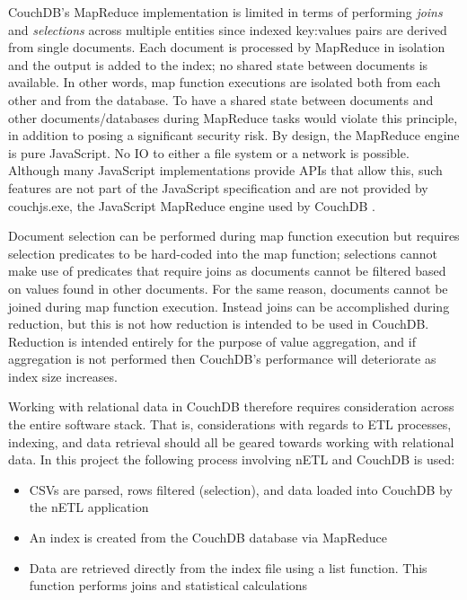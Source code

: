 \label{chapter-analysis}
CouchDB's MapReduce implementation is limited in terms of performing \textit{joins} and \textit{selections} across multiple entities since indexed key:values pairs are derived from single documents. Each document is processed by MapReduce in isolation and the output is added to the index; no shared state between documents is available. In other words, map function executions are isolated both from each other and from the database. To have a shared state between documents and other documents/databases during MapReduce tasks would violate this principle, in addition to posing a significant security risk. By design, the MapReduce engine is pure JavaScript. No IO to either a file system or a network is possible. Although many JavaScript implementations provide APIs that allow this, such features are not part of the JavaScript specification and are not provided by couchjs.exe, the JavaScript MapReduce engine used by CouchDB \cite{slack28Feb}.

Document selection can be performed during map function execution but requires selection predicates to be hard-coded into the map function; selections cannot make use of predicates that require joins as documents cannot be filtered based on values found in other documents. For the same reason, documents cannot be joined during map function execution. Instead joins can be accomplished during reduction, but this is not how reduction is intended to be used in CouchDB. Reduction is intended entirely for the purpose of value aggregation, and if aggregation is not performed then CouchDB’s performance will deteriorate as index size increases.

Working with relational data in CouchDB therefore requires consideration across the entire software stack. That is, considerations with regards to ETL processes, indexing, and data retrieval should all be geared towards working with relational data. In this project the following process involving nETL and CouchDB is used:

\begin{itemize}
    \item CSVs are parsed, rows filtered (selection), and data loaded into CouchDB by the nETL application
    \item An index is created from the CouchDB database via MapReduce
    \item Data are retrieved directly from the index file using a list function. This function performs joins and statistical calculations
\end{itemize}

